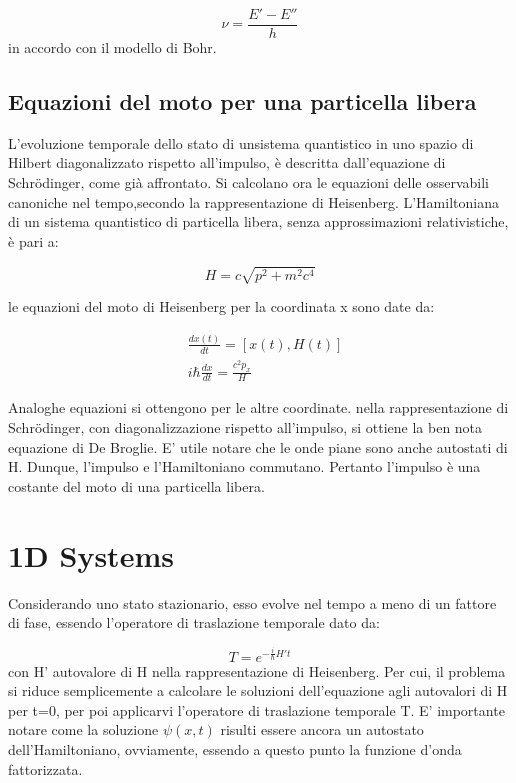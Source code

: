 \documentclass{article}
\begin{document}
\begin{equation}
    \nu= \frac{E'-E''}{h}
\end{equation}
in accordo con il modello di Bohr.

\subsection{Equazioni del moto per una particella libera}
L'evoluzione temporale dello stato di unsistema quantistico in uno spazio di Hilbert diagonalizzato rispetto all'impulso,
è descritta dall'equazione di Schrödinger, come già affrontato.
Si calcolano ora le equazioni delle osservabili canoniche nel tempo,secondo la rappresentazione di Heisenberg.
L'Hamiltoniana di un sistema quantistico di particella libera, senza approssimazioni relativistiche, è pari a:

\begin{equation}
    H=c\sqrt{p^2+m^2c^4}
\end{equation}

le equazioni del moto di Heisenberg per la coordinata x sono date da:

\begin{equation}
    \begin{aligned}
         & \frac{dx(t)}{dt}= [x(t),H(t)]          \\
         & i\hbar \frac{dx}{dt}= \frac{c^2p_x}{H}
    \end{aligned}
\end{equation}

Analoghe equazioni si ottengono per le altre coordinate.
nella rappresentazione di Schrödinger, con diagonalizzazione rispetto all'impulso, si ottiene la ben nota equazione di De Broglie.
E' utile notare che le onde piane sono anche autostati di H. Dunque, l'impulso e l'Hamiltoniano commutano. Pertanto l'impulso è una costante del moto di una particella libera.

\section{1D Systems}


Considerando uno stato stazionario, esso evolve nel tempo a meno di un fattore di fase, essendo l'operatore di traslazione temporale dato da:

\begin{equation}
    T=e^{-\frac{i}{\hbar}H't}
\end{equation}
con H' autovalore di H nella rappresentazione di Heisenberg.
Per cui, il problema si riduce semplicemente a calcolare le soluzioni dell'equazione agli autovalori di H per t=0, per poi applicarvi l'operatore di traslazione temporale T.
E' importante notare come la soluzione $\psi(x,t)$ risulti essere ancora un autostato dell'Hamiltoniano, ovviamente, essendo a questo punto la funzione d'onda fattorizzata.
\end{document}
